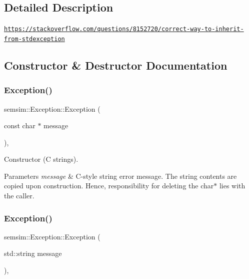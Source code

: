 \subsection{Detailed Description}
\href{https://stackoverflow.com/questions/8152720/correct-way-to-inherit-from-stdexception}{\tt https\+://stackoverflow.\+com/questions/8152720/correct-\/way-\/to-\/inherit-\/from-\/stdexception} 

\subsection{Constructor \& Destructor Documentation}
\mbox{\label{classsemsim_1_1Exception_ae32b373f579fc88ca9a9b406327f6549}} 
\subsubsection{\texorpdfstring{Exception()}{Exception()}\hspace{0.1cm}{\footnotesize\ttfamily [1/2]}}
{\footnotesize\ttfamily semsim\+::\+Exception\+::\+Exception (\begin{DoxyParamCaption}\item[{const char $\ast$}]{message }\end{DoxyParamCaption})\hspace{0.3cm}{\ttfamily [inline]}, {\ttfamily [explicit]}}

Constructor (C strings). 
\begin{DoxyParams}{Parameters}
{\em message} & C-\/style string error message. The string contents are copied upon construction. Hence, responsibility for deleting the char$\ast$ lies with the caller. \\
\hline
\end{DoxyParams}
\mbox{\label{classsemsim_1_1Exception_acd15baba130b34cb81da8ce237406e99}} 
\subsubsection{\texorpdfstring{Exception()}{Exception()}\hspace{0.1cm}{\footnotesize\ttfamily [2/2]}}
{\footnotesize\ttfamily semsim\+::\+Exception\+::\+Exception (\begin{DoxyParamCaption}\item[{std\+::string}]{message }\end{DoxyParamCaption})\hspace{0.3cm}{\ttfamily [inline]}, {\ttfamily [explicit]}}

